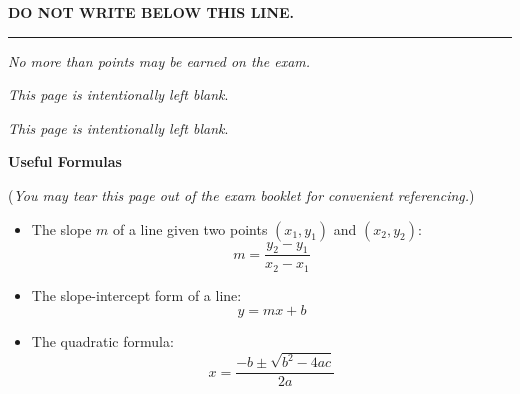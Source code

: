 \documentclass[addpoints,12pt,answers]{exam}
\begin{document}
\bigskip
\centerline{\textbf{DO NOT WRITE BELOW THIS LINE.}}
\rule{\textwidth}{.2mm}

\vfill

\newpage

\changefontsize{14pt}

\begin{center}
	\gradetable[v][pages]
	
	\vspace{12pt}
	\textit{No more than \numpoints{} points may be earned on the exam.}
	
\end{center}

\vfill

\newpage
\phantom{.}
\vfill
\begin{center}
   \textit{This page is intentionally left blank}.
\end{center}
\vfill
\newpage

\newpage
\phantom{.}
\vfill
\begin{center}
   \textit{This page is intentionally left blank}.
\end{center}
\vfill
\newpage

\changefontsize{18pt}

\begin{center}
   {\Large \textbf{Useful Formulas}}
\end{center}

(\textit{You may tear this page out of the exam booklet for convenient referencing.})

\begin{itemize}
   \item The slope $m$ of a line given two points $(x_1,y_1)$ and $(x_2,y_2)$: 
   \[m = \frac{y_2-y_1}{x_2-x_1}\]
   \item The slope-intercept form of a line:
   \[y=mx+b\]
   \item The quadratic formula:
   \[x = \frac{-b\pm\sqrt{b^2-4ac}}{2a}\]
\end{itemize}
\end{document}

